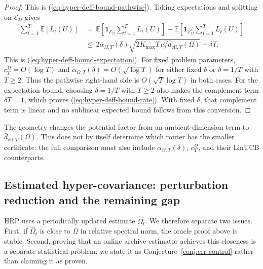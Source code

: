 \documentclass{article} %
\renewcommand{\eqref}[1]{\textup{(\ref{#1})}}
\begin{document}
\begin{proof}
This is \eqref{eq:hyper-deff-bound-pathwise}.  Taking expectations and splitting on \(\mathcal{E}_{\Omega}\) gives
\begin{equation}
\label{eq:hyper-deff-proof-expectation-split}
\begin{aligned}
\sum_{t=1}^{T}\mathbb{E}[L_t(U)]
&\,=\,
\mathbb{E}
\!\left[
\mathbf{1}_{\mathcal{E}_{\Omega}}
\sum_{t=1}^{T}L_t(U)
\right]
+
\mathbb{E}
\!\left[
\mathbf{1}_{\mathcal{E}_{\Omega}^{c}}
\sum_{t=1}^{T}L_t(U)
\right]
\\
&\,\leq\,
2\alpha_{\Omega,T}(\delta)
\sqrt{
2K_{\max}T\,c_T^\Omega
\bar d_{\mathrm{eff},T}(\Omega)
}
+\delta T .
\end{aligned}
\end{equation}
This is \eqref{eq:hyper-deff-bound-expectation}. For fixed problem
parameters, \(c_T^\Omega=O(\log T)\) and
\(\alpha_{\Omega,T}(\delta)=O(\sqrt{\log T})\) for either fixed \(\delta\)
or \(\delta=1/T\) with \(T\ge2\). Thus the pathwise right-hand side is
\(O(\sqrt T\log T)\) in both cases. For the expectation bound, choosing
\(\delta=1/T\) with \(T\ge2\) also makes the complement term \(\delta T=1\), which proves
\eqref{eq:hyper-deff-bound-rate}. With fixed \(\delta\), that complement term
is linear and no sublinear expected bound follows from this conversion.
\end{proof}

The geometry changes the potential factor from an ambient-dimension term to
\(\bar d_{\mathrm{eff},T}(\Omega)\). This does not by itself determine which
router has the smaller certificate: the full comparison must also include
\(\alpha_{\Omega,T}(\delta)\), \(c_T^\Omega\), and their LinUCB counterparts.

\subsection{Estimated hyper-covariance: perturbation reduction and the remaining gap}
\label{sec:theory-estimated-hyper}

HRP uses a periodically updated estimate \(\widehat{\Omega}_t\). We therefore separate two issues. First, if \(\widehat{\Omega}_t\) is close to \(\Omega\) in relative spectral norm, the oracle proof above is stable. Second, proving that an online archive estimator achieves this closeness is a separate statistical problem; we state it as Conjecture~\ref{conj:err-control} rather than claiming it as proven.
\end{document}
